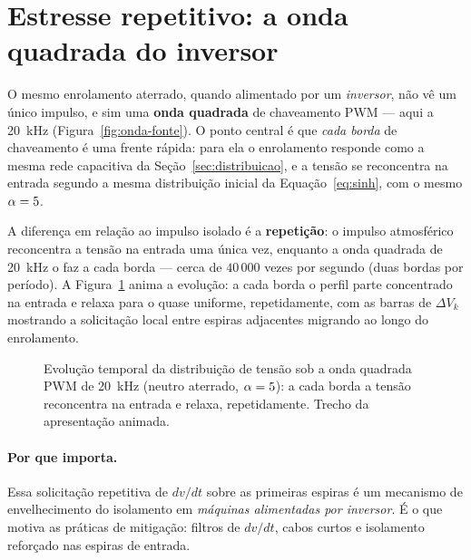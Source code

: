 \section{Estresse repetitivo: a onda quadrada do inversor}
\label{sec:onda-quadrada}

O mesmo enrolamento aterrado, quando alimentado por um \emph{inversor}, não vê um único
impulso, e sim uma \textbf{onda quadrada} de chaveamento PWM --- aqui a \SI{20}{\kilo\hertz}
(Figura~\ref{fig:onda-fonte}). O ponto central é que \emph{cada borda} de chaveamento é uma
frente rápida: para ela o enrolamento responde como a mesma rede capacitiva da
Seção~\ref{sec:distribuicao}, e a tensão se reconcentra na entrada segundo a mesma
distribuição inicial da Equação~\eqref{eq:sinh}, com o mesmo $\alpha = 5$.


A diferença em relação ao impulso isolado é a \textbf{repetição}: o impulso atmosférico
reconcentra a tensão na entrada uma única vez, enquanto a onda quadrada de
\SI{20}{\kilo\hertz} o faz a cada borda --- cerca de $40\,000$ vezes por segundo (duas
bordas por período). A Figura~\ref{fig:anim-quadrada} anima a evolução: a cada borda o
perfil parte concentrado na entrada e relaxa para o quase uniforme, repetidamente, com as
barras de $\Delta V_k$ mostrando a solicitação local entre espiras adjacentes migrando ao
longo do enrolamento.

\begin{figure}[H]
\centering
{}
\caption{Evolução temporal da distribuição de tensão sob a onda quadrada PWM de
\SI{20}{\kilo\hertz} (neutro aterrado, $\alpha = 5$): a cada borda a tensão reconcentra na
entrada e relaxa, repetidamente. Trecho da apresentação animada.}
\label{fig:anim-quadrada}
\end{figure}

\paragraph{Por que importa.} Essa solicitação repetitiva de $dv/dt$ sobre as primeiras
espiras é um mecanismo de envelhecimento do isolamento em \emph{máquinas alimentadas por
inversor}. É o que motiva as práticas de mitigação: filtros de $dv/dt$, cabos curtos e
isolamento reforçado nas espiras de entrada.

